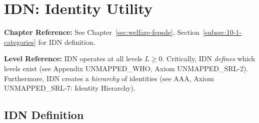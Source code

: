 \section{IDN: Identity Utility}
\label{sec:app-c-idn}

\begin{cross-reference}
\textbf{Chapter Reference:} See Chapter~\ref{sec:welfare-fepsde}, 
Section~\ref{subsec:10-1-categories} for IDN definition.

\textbf{Level Reference:} IDN operates at all levels $L \geq 0$. Critically, 
IDN \textit{defines} which levels exist (see Appendix UNMAPPED_WHO, Axiom UNMAPPED_SRL-2). 
Furthermore, IDN creates a \textit{hierarchy} of identities (see AAA, Axiom UNMAPPED_SRL-7: 
Identity Hierarchy).
\end{cross-reference}

\subsection{IDN Definition}

